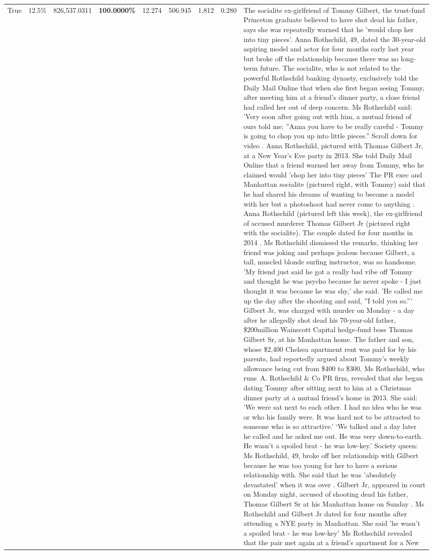 \begin{table}[H]
\begin{tabular}{lllrlllll}
True & 12.5\% & 826,537.0311 & \bfseries \color{red} 100.0000\% & 12.274 & 506.945 & 1,812 & 0.280 & The socialite ex-girlfriend of Tommy Gilbert, the trust-fund Princeton graduate believed to have shot dead his father, says she was repeatedly warned that he 'would chop her into tiny pieces'. Anna Rothschild, 49, dated the 30-year-old aspiring model and actor for four months early last year but broke off the relationship because there was no long-term future. The socialite, who is not related to the powerful Rothschild banking dynasty, exclusively told the Daily Mail Online that when she first began seeing Tommy, after meeting him at a friend's dinner party, a close friend had called her out of deep concern. Ms Rothschild said: 'Very soon after going out with him, a mutual friend of ours told me: ''Anna you have to be really careful - Tommy is going to chop you up into little pieces.'' Scroll down for video . Anna Rothschild, pictured with Thomas Gilbert Jr, at a New Year's Eve party in 2013. She told Daily Mail Online that a friend warned her away from Tommy, who he claimed would 'chop her into tiny pieces' The PR exec and Manhattan socialite (pictured right, with Tommy) said that he had shared his dreams of wanting to become a model with her but a photoshoot had never come to anything . Anna Rothschild (pictured left this week), the ex-girlfriend of accused murderer Thomas Gilbert Jr (pictured right with the socialite). The couple dated for four months in 2014 . Ms Rothschild dismissed the remarks, thinking her friend was joking and perhaps jealous because Gilbert, a tall, muscled blonde surfing instructor, was so handsome. 'My friend just said he got a really bad vibe off Tommy and thought he was psycho because he never spoke - I just thought it was because he was shy,' she said. 'He called me up the day after the shooting and said, ''I told you so.''' Gilbert Jr, was charged with murder on Monday - a day after he allegedly shot dead his 70-year-old father, \$200million Wainscott Capital hedge-fund boss Thomas Gilbert Sr, at his Manhattan home. The father and son, whose \$2,400 Chelsea apartment rent was paid for by his parents, had reportedly argued about Tommy's weekly allowance being cut from \$400 to \$300. Ms Rothschild, who runs A. Rothschild \& Co PR firm, revealed that she began dating Tommy after sitting next to him at a Christmas dinner party at a mutual friend's home in 2013. She said: 'We were sat next to each other. I had no idea who he was or who his family were. It was hard not to be attracted to someone who is so attractive.' ‘We talked and a day later he called and he asked me out. He was very down-to-earth. He wasn’t a spoiled brat - he was low-key.’ Society queen: Ms Rothschild, 49, broke off her relationship with Gilbert because he was too young for her to have a serious relationship with. She said that he was 'absolutely devastated' when it was over . Gilbert Jr, appeared in court on Monday night, accused of shooting dead his father, Thomas Gilbert Sr at his Manhattan home on Sunday . Ms Rothschild and Gilbert Jr dated for four months after attending a NYE party in Manhattan. She said 'he wasn't a spoiled brat - he was low-key' Ms Rothschild revealed that the pair met again at a friend’s apartment for a New 
\end{tabular}
\end{table}
